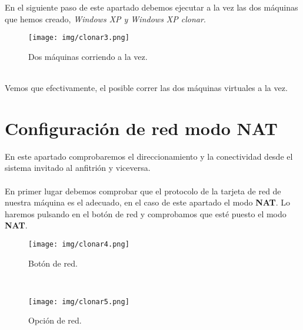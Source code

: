 \documentclass[12pt]{article}
\begin{document}
      \newpage

      En el siguiente paso de este apartado debemos ejecutar a la vez las dos máquinas que hemos creado, \textit{Windows XP y Windows XP clonar}.
      \begin{figure}[h]
        \centering
        \texttt{[image: img/clonar3.png]}
        \caption{Dos máquinas corriendo a la vez.}
        \label{Clonado3}
      \end{figure}
      \\
      Vemos que efectivamente, el posible correr las dos máquinas virtuales a la vez.

      \newpage

    \section{Configuración de red modo NAT}
      En este apartado comprobaremos el direccionamiento y la conectividad desde el sistema invitado al anfitrión y viceversa.
      \\\\
      En primer lugar debemos comprobar que el protocolo de la tarjeta de red de nuestra máquina es el adecuado, en el caso de 
      este apartado el modo \textbf{NAT}. Lo haremos pulsando en el botón de red y comprobamos que esté puesto el modo \textbf{NAT}.
      \\
      \begin{figure}[h]
        \centering
        \texttt{[image: img/clonar4.png]}
        \caption{Botón de red.}
        \label{Nat}
      \end{figure}
      \\
      \begin{figure}[h]
        \centering
        \texttt{[image: img/clonar5.png]}
        \caption{Opción de red.}
        \label{Nat2}
      \end{figure}

      \newpage
\end{document}
